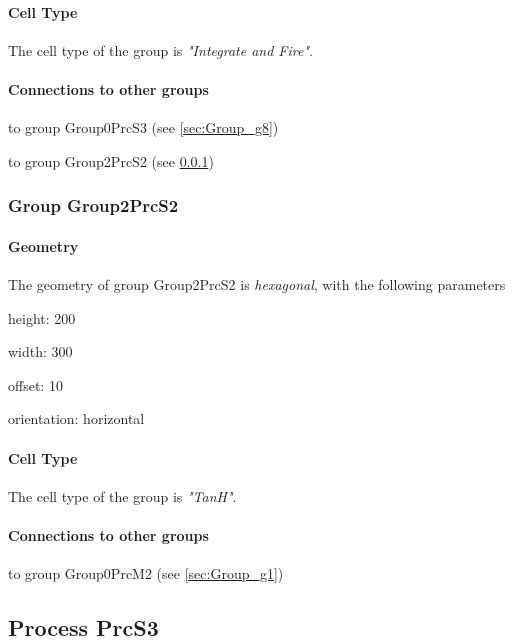 \documentclass[a4paper, 11pt]{article}
\begin{document}
\paragraph*{Cell Type}
The cell type of the group is \emph{"Integrate and Fire"}.
\paragraph*{Connections to other groups}
\begin{compactenum}
\item to group Group0PrcS3 (see \ref{sec:Group_g8})
\item to group Group2PrcS2 (see \ref{sec:Group_g7})
\end{compactenum}

\subsubsection{Group Group2PrcS2}
\label{sec:Group_g7}

\paragraph*{Geometry}

The geometry of group Group2PrcS2 is \emph{hexagonal}, with
the following parameters
\begin{compactitem}
    \item height: 200
    \item width: 300
    \item offset: 10
    \item orientation: horizontal
\end{compactitem}

\paragraph*{Cell Type}
The cell type of the group is \emph{"TanH"}.
\paragraph*{Connections to other groups}
\begin{compactenum}
\item to group Group0PrcM2 (see \ref{sec:Group_g1})
\end{compactenum}


\subsection{Process PrcS3}
\end{document}
